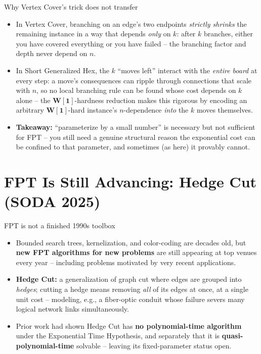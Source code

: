 \documentclass[11pt,aspectratio=169]{beamer}
\begin{document}
\begin{frame}{Why Vertex Cover's trick does not transfer}
  \begin{itemize}
    \item In Vertex Cover, branching on an edge's two endpoints \emph{strictly
    shrinks} the remaining instance in a way that depends \emph{only} on $k$: after
    $k$ branches, either you have covered everything or you have failed -- the
    branching factor and depth never depend on $n$.
    \item In Short Generalized Hex, the $k$ ``moves left'' interact with the
    \emph{entire board} at every step: a move's consequences can ripple through
    connections that scale with $n$, so no local branching rule can be found whose
    cost depends on $k$ alone -- the $\mathbf{W[1]}$-hardness reduction makes this
    rigorous by encoding an arbitrary $\mathbf{W[1]}$-hard instance's $n$-dependence
    \emph{into} the $k$ moves themselves.
    \item \textbf{Takeaway:} ``parameterize by a small number'' is necessary but not
    sufficient for FPT -- you still need a genuine structural reason the exponential
    cost can be confined to that parameter, and sometimes (as here) it provably cannot.
  \end{itemize}
\end{frame}

\section{FPT Is Still Advancing: Hedge Cut (SODA 2025)}

\begin{frame}{FPT is not a finished 1990s toolbox}
  \begin{itemize}
    \item Bounded search trees, kernelization, and color-coding are decades old, but
    \textbf{new FPT algorithms for new problems} are still appearing at top venues
    every year -- including problems motivated by very recent applications.
    \item \textbf{Hedge Cut:} a generalization of graph cut where edges are grouped
    into \emph{hedges}; cutting a hedge means removing \emph{all} of its edges at
    once, at a single unit cost -- modeling, e.g., a fiber-optic conduit whose failure
    severs many logical network links simultaneously.
    \item Prior work had shown Hedge Cut has \textbf{no polynomial-time algorithm}
    under the Exponential Time Hypothesis, and separately that it is
    \textbf{quasi-polynomial-time} solvable -- leaving its fixed-parameter status open.
  \end{itemize}
\end{frame}
\end{document}
